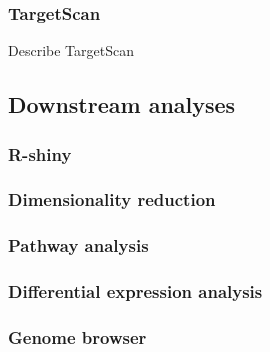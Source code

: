 \subsubsection{TargetScan}
Describe TargetScan

\subsection{Downstream analyses}
\subsubsection{R-shiny}
\subsubsection{Dimensionality reduction}
\subsubsection{Pathway analysis}
\subsubsection{Differential expression analysis}
\subsubsection{Genome browser}

